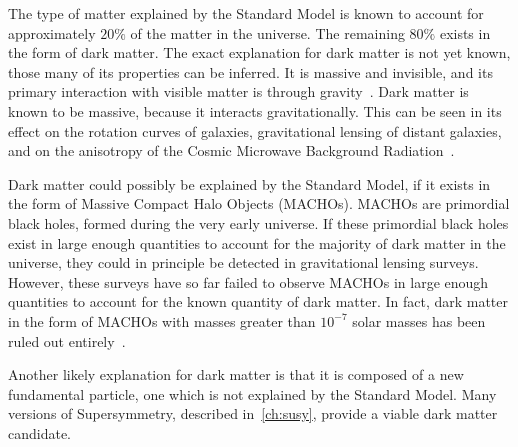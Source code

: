 The type of matter explained by the Standard Model is known to account for approximately $20\%$ of the matter in the universe.
The remaining $80\%$ exists in the form of dark matter.
The exact explanation for dark matter is not yet known, those many of its properties can be inferred.
It is massive and invisible, and its primary interaction with visible matter is through gravity~\cite{sm-pdg-dark-matter}.
Dark matter is known to be massive, because it interacts gravitationally.
This can be seen in its effect on the rotation curves of galaxies, gravitational lensing of distant galaxies,
and on the anisotropy of the Cosmic Microwave Background Radiation~\cite{sm-kolb-cmb}.

Dark matter could possibly be explained by the Standard Model, if it exists in the form of Massive Compact Halo Objects (MACHOs).
MACHOs are primordial black holes, formed during the very early universe.
If these primordial black holes exist in large enough quantities to account for the majority of dark matter in the universe, they could in principle be detected in gravitational lensing surveys.
However, these surveys have so far failed to observe MACHOs in large enough quantities to account for the known quantity of dark matter.
In fact, dark matter in the form of MACHOs with masses greater than $10^{-7}$ solar masses has been ruled out entirely~\cite{sm-macho-dark-matter}.

Another likely explanation for dark matter is that it is composed of a new fundamental particle, one which is not explained by the Standard Model.
Many versions of Supersymmetry, described in~\ref{ch:susy}, provide a viable dark matter candidate.

